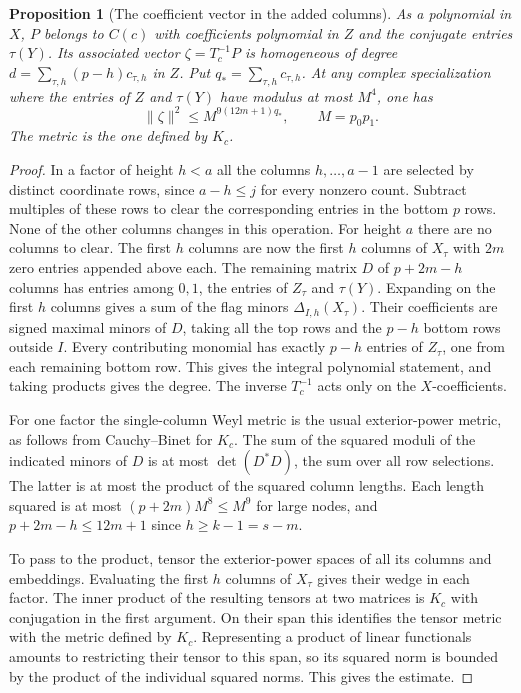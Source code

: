 \documentclass[a4paper,11pt]{article}
\newtheorem{proposition}{Proposition}[section]
\theoremstyle{definition}
\theoremstyle{remark}
\numberwithin{equation}{section}
\begin{document}
\begin{proposition}[The coefficient vector in the added columns]
\leavevmode\label{prop:stackednorm819}
As a polynomial in \(X\), \(P\) belongs to \(C(c)\) with
coefficients polynomial in \(Z\) and the conjugate entries
\(\tau(Y)\). Its associated vector \(\zeta=T_c^{-1}P\) is
homogeneous of degree \(d=\sum_{\tau,h}(p-h)c_{\tau,h}\)
in \(Z\). Put \(q_*=\sum_{\tau,h}c_{\tau,h}\).
At any complex specialization where the entries of \(Z\)
and \(\tau(Y)\) have modulus at most \(M^4\), one has
\[
          \|\zeta\|^2\le M^{9(12m+1)q_*},
                 \qquad M=p_0p_1 .
\]
The metric is the one defined by \(K_c\).
\end{proposition}
\begin{proof}
In a factor of height \(h<a\) all the columns \(h,\ldots,a-1\)
are selected by distinct coordinate rows, since \(a-h\le j\)
for every nonzero count. Subtract multiples of these rows
to clear the corresponding entries in the bottom \(p\)
rows. None of the other columns changes in this operation.
For height \(a\) there are no columns to clear. The first
\(h\) columns are now the first \(h\) columns of \(X_\tau\)
with \(2m\) zero entries appended above each. The remaining
matrix \(D\) of \(p+2m-h\) columns has entries among
\(0,1\), the entries of \(Z_\tau\) and \(\tau(Y)\).
Expanding on the first \(h\) columns gives a sum of the
flag minors \(\Delta_{I,h}(X_\tau)\). Their coefficients
are signed maximal minors of \(D\), taking all the top
rows and the \(p-h\) bottom rows outside \(I\).
Every contributing monomial has exactly \(p-h\) entries
of \(Z_\tau\), one from each remaining bottom row.
This gives the integral polynomial statement, and taking
products gives the degree. The inverse \(T_c^{-1}\) acts
only on the \(X\)-coefficients.

For one factor the single-column Weyl metric is the
usual exterior-power metric, as follows from Cauchy--Binet
for \(K_c\). The sum of the squared moduli of the indicated
minors of \(D\) is at most \(\det(D^*D)\), the sum over all
row selections. The latter is at most the product of the
squared column lengths. Each length squared is at most
\((p+2m)M^8\le M^9\) for large nodes, and
\(p+2m-h\le12m+1\) since \(h\ge k-1=s-m\).

To pass to the product, tensor the exterior-power spaces
of all its columns and embeddings. Evaluating the first
\(h\) columns of \(X_\tau\) gives their wedge in each
factor. The inner product of the resulting tensors at
two matrices is \(K_c\) with conjugation in the first
argument. On their span this identifies the tensor metric
with the metric defined by \(K_c\). Representing a product
of linear functionals amounts to restricting their tensor
to this span, so its squared norm is bounded by the product
of the individual squared norms. This gives the estimate.
\end{proof}
\end{document}
